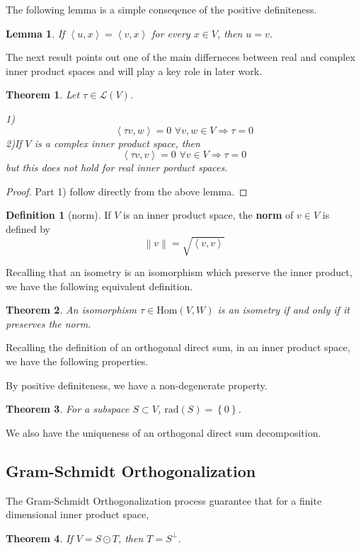 \documentclass{book}
\newtheorem{theorem}{Theorem}[section]
\newtheorem{lemma}{Lemma}[section]
\theoremstyle{definition}
\newtheorem{definition}{Definition}[section]
\begin{document}
The following lemma is a simple conseqence of the positive definiteness.
\begin{lemma}
If $\left \langle u,x \right \rangle =\left \langle v,x \right \rangle$ for every $x\in V$, then $u=v$.
\end{lemma}
The next result points out one of the main differneces between real and complex inner product spaces and will play a key role in later work. 
\begin{theorem}
Let $\tau\in \mathcal{L}(V)$.\par
1)\begin{equation*}  \left\langle \tau v,w\right\rangle=0\,\, \forall v,w\in V\Longrightarrow \tau=0 \end{equation*}
2)If $V$ is a complex inner product space, then
\begin{equation*} \left\langle\tau v,v\right\rangle=0\,\, \forall v\in V\Longrightarrow\tau=0\end{equation*}
but this does not hold for real inner porduct spaces.
\end{theorem}
\begin{proof}
Part 1) follow directly from the above lemma. 
\end{proof}
\begin{definition}[norm]
If $V$ is an inner product space, the \textbf{norm} of $v\in V$ is defined by
\begin{equation*} \left \| v \right \| =\sqrt{\left \langle v,v \right \rangle } \end{equation*}
\end{definition}
Recalling that an isometry is an isomorphism which preserve the inner product, we have the following equivalent definition.
\begin{theorem}
An isomorphism $\tau\in \text{Hom}(V,W)$ is an isometry if and only if it preserves the norm.
\end{theorem}

Recalling the definition of an orthogonal direct sum, in an inner product space, we have the following properties.\par
By positive definiteness, we have a non-degenerate property.
\begin{theorem}
For a subspace $S\subset V$, $\text{rad}(S)=\left \{ 0 \right \} $.
\end{theorem}

We also have the uniqueness of an orthogonal direct sum decomposition.

\subsection{Gram-Schmidt Orthogonalization}
The Gram-Schmidt Orthogonalization process guarantee that for a finite dimensional inner product space, 
\begin{theorem}
If $V=S\odot T$, then $T=S^\perp$.
\end{theorem}
\end{document}
